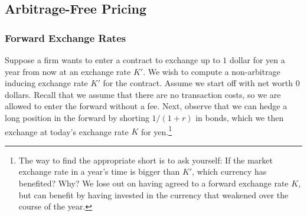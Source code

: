 \documentclass[12pt]{article}
\theoremstyle{plain}
\theoremstyle{definition}
\theoremstyle{remark}
\numberwithin{equation}{section}  %
\begin{document}
\subsection{Arbitrage-Free Pricing}
\subsubsection{Forward Exchange Rates}
    Suppose a firm wants to enter a contract to exchange up to $1$
    dollar for yen a year from now at an exchange rate $K'$. We
    wish to compute a non-arbitrage inducing exchange rate $K'$ for the
    contract. 
    Assume we start off with net worth $0$ dollars. Recall that we assume that there are no transaction costs, so we are allowed to enter the forward without a fee. 
    Next, observe that we can hedge a long position in the forward by
    shorting $1/(1+r)$ in bonds, which we then exchange at today's exchange rate
    $K$ for yen.\footnote{The way to find the appropriate short is to ask yourself: If
        the market exchange rate in a year's time is bigger than $K'$,
        which currency has benefited? Why?  We lose out on having agreed to
        a forward exchange rate $K$, but can benefit by having invested in
    the currency that weakened over the course of the year.}
    
\end{document}

